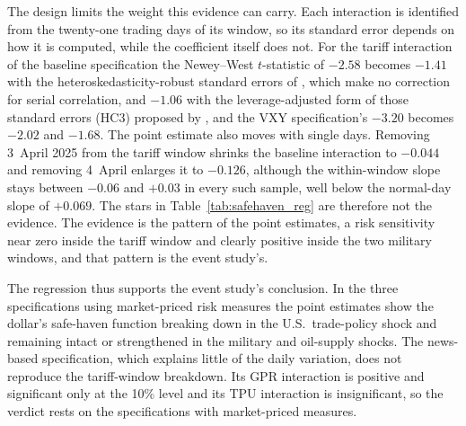The design limits the weight this evidence can carry. Each interaction is identified from the twenty-one trading days of its window, so its standard error depends on how it is computed, while the coefficient itself does not. For the tariff interaction of the baseline specification the Newey--West $t$-statistic of $-2.58$ becomes $-1.41$ with the heteroskedasticity-robust standard errors of \textcite{white_1980}, which make no correction for serial correlation, and $-1.06$ with the leverage-adjusted form of those standard errors (HC3) proposed by \textcite{mackinnon_white_1985}, and the VXY specification's $-3.20$ becomes $-2.02$ and $-1.68$. The point estimate also moves with single days. Removing 3~April 2025 from the tariff window shrinks the baseline interaction to $-0.044$ and removing 4~April enlarges it to $-0.126$, although the within-window slope stays between $-0.06$ and $+0.03$ in every such sample, well below the normal-day slope of $+0.069$. The stars in Table~\ref{tab:safehaven_reg} are therefore not the evidence. The evidence is the pattern of the point estimates, a risk sensitivity near zero inside the tariff window and clearly positive inside the two military windows, and that pattern is the event study's.

The regression thus supports the event study's conclusion. In the three specifications using market-priced risk measures the point estimates show the dollar's safe-haven function breaking down in the U.S.\ trade-policy shock and remaining intact or strengthened in the military and oil-supply shocks. The news-based specification, which explains little of the daily variation, does not reproduce the tariff-window breakdown. Its GPR interaction is positive and significant only at the 10\% level and its TPU interaction is insignificant, so the verdict rests on the specifications with market-priced measures.
